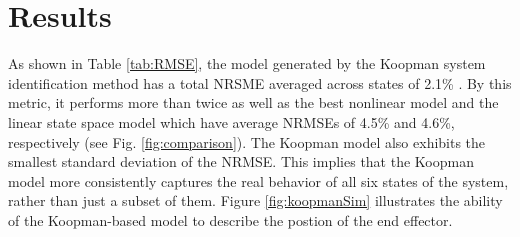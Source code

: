 \section{Results}
\label{sec:results}

As shown in Table \ref{tab:RMSE}, the model generated by the Koopman system identification method has a total NRSME averaged across states of 2.1\% . 
By this metric, it performs more than twice as well as the best nonlinear model and the linear state space model which have average NRMSEs of 4.5\% and 4.6\%, respectively (see Fig. \ref{fig:comparison}).
The Koopman model also exhibits the smallest standard deviation of the NRMSE.
This implies that the Koopman model more consistently captures the real behavior of all six states of the system, rather than just a subset of them.
Figure \ref{fig:koopmanSim} illustrates the ability of the Koopman-based model to describe the postion of the end effector. 




